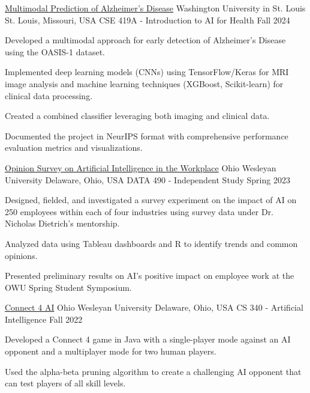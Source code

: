 \documentclass[10pt, letterpaper]{article}
\begin{document}
\begin{researchentry}
  {\href{https://github.com/agopalareddy/CSE419A_Multimodal_Prediction_of_Alzheimers}{Multimodal Prediction of Alzheimer's Disease}} %
  {Washington University in St. Louis} %
  {St. Louis, Missouri, USA} %
  {CSE 419A - Introduction to AI for Health} %
  {Fall 2024} %
  \item Developed a multimodal approach for early detection of Alzheimer's Disease using the OASIS-1 dataset.
  \item Implemented deep learning models (CNNs) using TensorFlow/Keras for MRI image analysis and machine learning techniques (XGBoost, Scikit-learn) for clinical data processing.
  \item Created a combined classifier leveraging both imaging and clinical data.
  \item Documented the project in NeurIPS format with comprehensive performance evaluation metrics and visualizations.
\end{researchentry}

\begin{researchentry}
  {\href{https://github.com/agopalareddy/DATA490}{Opinion Survey on Artificial Intelligence in the Workplace}} %
  {Ohio Wesleyan University} %
  {Delaware, Ohio, USA} %
  {DATA 490 - Independent Study} %
  {Spring 2023} %
  \item Designed, fielded, and investigated a survey experiment on the impact of AI on 250 employees within each of four industries using survey data under Dr. Nicholas Dietrich's mentorship.
  \item Analyzed data using Tableau dashboards and R to identify trends and common opinions.
  \item Presented preliminary results on AI's positive impact on employee work at the OWU Spring Student Symposium.
\end{researchentry}

\begin{researchentry}
  {\href{https://github.com/agopalareddy/CS340Final-Connect4}{Connect 4 AI}} %
  {Ohio Wesleyan University} %
  {Delaware, Ohio, USA} %
  {CS 340 - Artificial Intelligence} %
  {Fall 2022} %
  \item Developed a Connect 4 game in Java with a single-player mode against an AI opponent and a multiplayer mode for two human players.
  \item Used the alpha-beta pruning algorithm to create a challenging AI opponent that can test players of all skill levels.
\end{researchentry}
\end{document}
